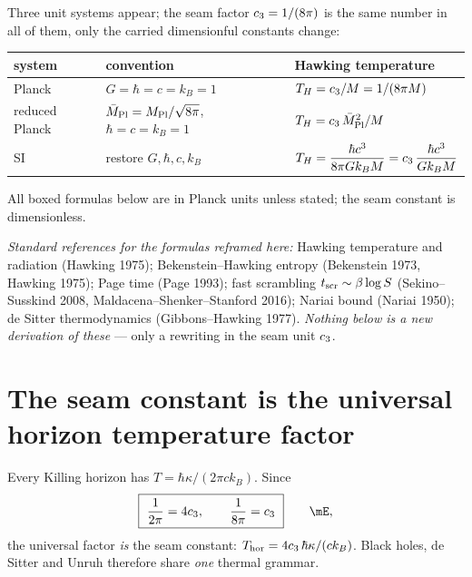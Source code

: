 \begin{keybox}
Three unit systems appear; the seam factor $c_3=1/(8\pi)$ is the same number in all of them, only the
carried dimensionful constants change:
\begin{center}\small
\renewcommand{\arraystretch}{1.25}
\begin{tabularx}{\linewidth}{@{}p{3.4cm}p{4.3cm}Y@{}}
\toprule
\textbf{system} & \textbf{convention} & \textbf{Hawking temperature} \\
\midrule
Planck & $G{=}\hbar{=}c{=}k_B{=}1$ & $T_H=c_3/M=1/(8\pi M)$ \\
reduced Planck & $\bar M_{\mathrm{Pl}}=M_{\rm Pl}/\sqrt{8\pi}$, $\hbar{=}c{=}k_B{=}1$ & $T_H=c_3\,\bar M_{\mathrm{Pl}}^2/M$ \\
SI & restore $G,\hbar,c,k_B$ & $T_H=\dfrac{\hbar c^3}{8\pi G k_B M}=c_3\,\dfrac{\hbar c^3}{Gk_BM}$ \\
\bottomrule
\end{tabularx}
\end{center}
All boxed formulas below are in Planck units unless stated; the seam constant is dimensionless.
\end{keybox}

\medskip
\noindent\emph{Standard references for the formulas reframed here:} Hawking temperature and radiation
(Hawking 1975); Bekenstein--Hawking entropy (Bekenstein 1973, Hawking 1975); Page time (Page 1993);
fast scrambling $t_{\rm scr}\sim\beta\log S$ (Sekino--Susskind 2008, Maldacena--Shenker--Stanford 2016);
Nariai bound (Nariai 1950); de Sitter thermodynamics (Gibbons--Hawking 1977). \emph{Nothing below is a
new derivation of these} --- only a rewriting in the seam unit $c_3$.

\section{The seam constant is the universal horizon temperature factor}
Every Killing horizon has $T=\hbar\kappa/(2\pi c k_B)$. Since
\[
  \boxed{\ \frac{1}{2\pi}=4\cthree,\qquad \frac{1}{8\pi}=\cthree\ }\qquad\mE,
\]
the universal factor \emph{is} the seam constant: $T_{\mathrm{hor}}=4c_3\,\hbar\kappa/(ck_B)$. Black
holes, de Sitter and Unruh therefore share \emph{one} thermal grammar. \mC\ 

